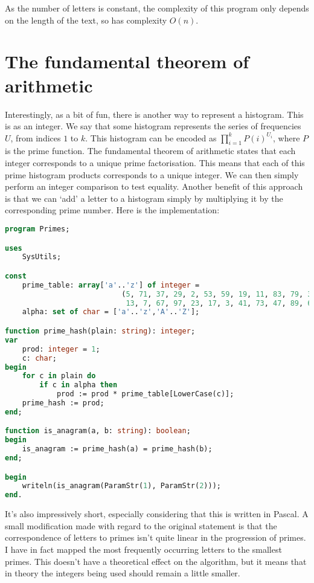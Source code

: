 \documentclass{article}
\begin{document}
    As the number of letters is constant, the complexity of this program only
    depends on the length of the text, so has complexity $O(n)$.

    \section{The fundamental theorem of arithmetic}

    Interestingly, as a bit of fun, there is another way to represent a
    histogram. This is as an integer. We say that some histogram represents the
    series of frequencies $U$, from indices $1$ to $k$.  This histogram can be
    encoded as
    $\prod\limits_{i=1}^{k} P(i)^{U_i}$,
    where $P$ is the prime function. The fundamental theorem of arithmetic
    states that each integer corresponds to a unique prime factorisation. This
    means that each of this prime histogram products corresponds to a unique
    integer. We can then simply perform an integer comparison to test equality.
    Another benefit of this approach is that we can `add' a letter to a
    histogram simply by multiplying it by the corresponding prime number. Here
    is the implementation:

\begin{lstlisting}[language=Pascal, caption=Prime-number anagram checking in Pascal]
program Primes;

uses
    SysUtils;

const
    prime_table: array['a'..'z'] of integer =
                           (5, 71, 37, 29, 2, 53, 59, 19, 11, 83, 79, 31, 43,
                            13, 7, 67, 97, 23, 17, 3, 41, 73, 47, 89, 61, 101);
    alpha: set of char = ['a'..'z','A'..'Z'];

function prime_hash(plain: string): integer;
var
    prod: integer = 1;
    c: char;
begin
    for c in plain do
        if c in alpha then
            prod := prod * prime_table[LowerCase(c)];
    prime_hash := prod;
end;

function is_anagram(a, b: string): boolean;
begin
    is_anagram := prime_hash(a) = prime_hash(b);
end;

begin
    writeln(is_anagram(ParamStr(1), ParamStr(2)));
end.
\end{lstlisting}

    It's also impressively short, especially considering that this is written
    in Pascal. A small modification made with regard to the original statement
    is that the correspondence of letters to primes isn't quite linear in the
    progression of primes. I have in fact mapped the most frequently occurring
    letters to the smallest primes. This doesn't have a theoretical effect on
    the algorithm, but it means that in theory the integers being used should
    remain a little smaller.
\end{document}
